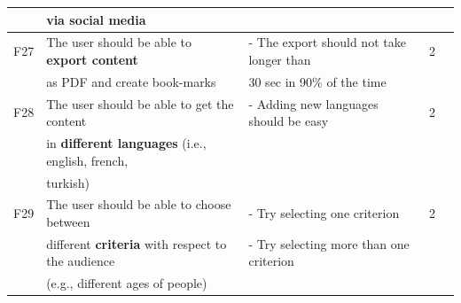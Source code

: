 {\begin{landscape}
\begin{center}
\begin{longtable}{|l|l|lll|}
		& via social media									&		& \\
	\hline
	F27 & The user should be able to \textbf{export content} 		& - The export should not take longer than  & 2\\
		& as PDF and create book-marks						& 30 sec in 90\% of the time	& \\
	\hline
	F28 & The user should be able to get the content 				& - Adding new languages should be easy  & 2\\
		& in \textbf{different languages} (i.e., english, french, 		&	& \\
		& turkish) 										&	& \\
	\hline
	F29 & The user should be able to choose between  			& - Try selecting one criterion & 2\\
		& different \textbf{criteria} with respect to the audience 		& - Try selecting more than one criterion	& \\
		& (e.g., different ages of people) 						&	& \\
\end{longtable}
\end{center} 
    \end{landscape}
    \clearpage%
}

